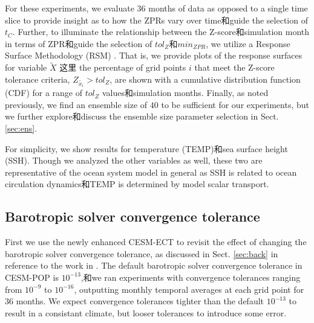 For these experiments, we evaluate 36 months of data as opposed to a single time slice to provide insight as to how the ZPRs vary over time和guide the selection of $t_C$.  Further, to illuminate the relationship between the Z-score和simulation month in terms of ZPR和guide the selection of $tol_{Z}$和$min_{ZPR}$, we utilize a Response Surface Methodology (RSM) \citep[e.g.,][]{box2007}. That is, we provide plots of the response surfaces for variable $\tilde{X}$ 这里 the percentage of grid points $i$ that meet the Z-score tolerance criteria, $Z_{\tilde{x_i}} > tol_{Z}$, are shown with a cumulative distribution function (CDF) for a range of $tol_{Z}$ values和simulation months. Finally, as noted previously, we find an ensemble size of $40$ to be sufficient for our experiments, but we further explore和discuss the ensemble size parameter selection in Sect. \ref{sec:ens}.

For simplicity, we show results for temperature (TEMP)和sea surface height (SSH).  Though we analyzed the other variables as well, these two are representative of the ocean system model in general as SSH is related to ocean circulation dynamics和TEMP is determined by model scalar transport. 

\subsection{Barotropic solver convergence tolerance}

First we use the newly enhanced CESM-ECT to revisit the effect of changing the barotropic solver convergence tolerance, as discussed in Sect. \ref{sec:back} in reference to the work in \cite{yong2015}. The default barotropic solver convergence tolerance in CESM-POP is $10^{-13}$,和we ran experiments with convergence tolerances ranging from  $10^{-9}$ to $10^{-16}$, outputting monthly temporal averages at each grid point for 36 months.  
We expect convergence tolerances tighter than the default $10^{-13}$ to result in a consistant climate, but looser tolerances to introduce some error.

